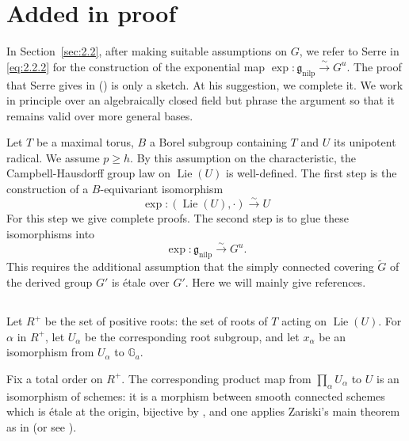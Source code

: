 \documentclass[11pt,a4paper]{article}
\theoremstyle{plain}
\theoremstyle{definition}
\DeclareMathOperator{\Lie}{Lie}
\newcommand{\G}{\mathbb{G}}
\newcommand{\nilp}{\mathrm{nilp}}
\begin{document}
\section{Added in proof}
\label{sec:6}

In Section~\ref{sec:2.2}, after making suitable assumptions on $G$, we refer to Serre in \eqref{eq:2.2.2} for the construction of the exponential map $\exp : \mathfrak{g}_\nilp \xrightarrow{\sim} G^u$. The proof that Serre gives in (\cite[Theorem~3, page~21]{S2}) is only a sketch. At his suggestion, we complete it. We work in principle over an algebraically closed field but phrase the argument so that it remains valid over more general bases.

Let $T$ be a maximal torus, $B$ a Borel subgroup containing $T$ and $U$ its unipotent radical. We assume $p \geq h$. By this assumption on the characteristic, the Campbell-Hausdorff group law on $\Lie(U)$ is well-defined. The first step is the construction of a $B$-equivariant isomorphism
\begin{equation} \label{eq:6.0.1}
\exp : (\Lie(U), \cdot) \xrightarrow{\sim} U
\end{equation}
For this step we give complete proofs. The second step is to glue these isomorphisms into
\begin{equation} \label{eq:6.0.2}
\exp : \mathfrak{g}_\nilp \xrightarrow{\sim} G^u.
\end{equation}
This requires the additional assumption that the simply connected covering $\tilde{G}$ of the derived group $G'$ is \'etale over $G'$. Here we will mainly give references.

\subsection{} \label{sec:6.1}
Let $R^+$ be the set of positive roots: the set of roots of $T$ acting on $\Lie(U)$. For $\alpha$ in $R^+$, let $U_\alpha$ be the corresponding root subgroup, and let $x_\alpha$ be an isomorphism from $U_\alpha$ to $\G_a$.

Fix a total order on $R^+$. The corresponding product map from $\prod_\alpha U_\alpha$ to $U$ is an isomorphism of schemes: it is a morphism between smooth connected schemes which is \'etale at the origin, bijective by \cite[13-05]{Bible}, and one applies Zariski's main theorem as in \cite[SGA3, XXII, 4.1]{SGA3} (or see \cite[IV, 14.5]{Bo2}).
\end{document}
